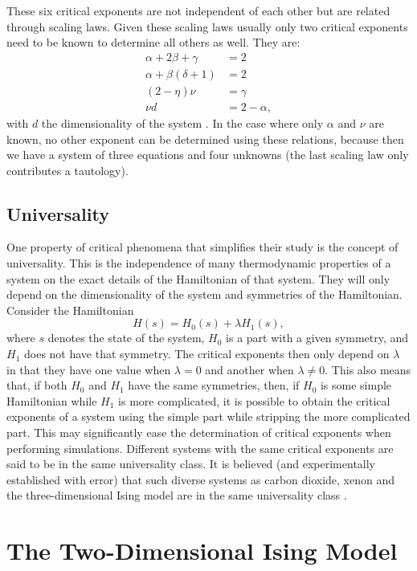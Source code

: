 \documentclass[11pt, a4paper]{report} %
\begin{document}
These six critical exponents are not independent of each other but are related through scaling laws.
Given these scaling laws usually only two critical exponents need to be known to determine all others as well.
They are:
\begin{align}
	\alpha + 2\beta +\gamma &= 2\\
	\alpha + \beta(\delta+1) &= 2\\
	(2-\eta)\nu &= \gamma \\
	\nu d &= 2- \alpha,
\end{align}
with \(d\) the dimensionality of the system \cite{binney:1992,baxter:1989,landau:2015}.
In the case where only \(\alpha\) and \(\nu\) are known, no other exponent can be determined using these relations, because then we have a system of three equations and four unknowns (the last scaling law only contributes a tautology).


\subsection{Universality}
One property of critical phenomena that simplifies their study is the concept of universality.
This is the independence of many thermodynamic properties of a system on the exact details of the Hamiltonian of that system.
They will only depend on the dimensionality of the system and symmetries of the Hamiltonian.
Consider the Hamiltonian
\begin{equation}
	H(s) = H_0(s) + \lambda H_1(s),
\end{equation}
where \(s\) denotes the state of the system, \(H_0\) is a part with a given symmetry, and \(H_1\) does not have that symmetry.
The critical exponents then only depend on \(\lambda\) in that they have one value when \(\lambda=0\) and another when \(\lambda \neq 0\).
This also means that, if both \(H_0\) and \(H_1\) have the same symmetries, then, if \(H_0\) is some simple Hamiltonian while \(H_1\) is more complicated, it is possible to obtain the critical exponents of a system using the simple part while stripping the more complicated part.
This may significantly ease the determination of critical exponents when performing simulations.
Different systems with the same critical exponents are said to be in the same universality class.
It is believed (and experimentally established with error) that such diverse systems as carbon dioxide, xenon and the three-dimensional Ising model are in the same universality class \cite{baxter:1989}.

\section{The Two-Dimensional Ising Model}\label{sec:ising_model}
\end{document}
